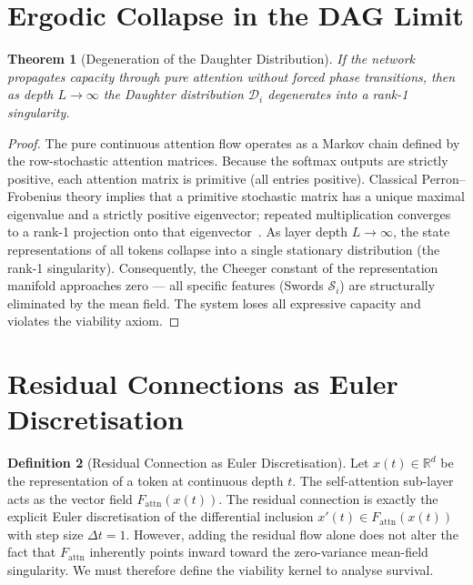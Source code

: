 \documentclass[11pt,a4paper]{article}
\newtheorem{theorem}{Theorem}[section]
\theoremstyle{definition}
\newtheorem{definition}[theorem]{Definition}
\theoremstyle{remark}
\begin{document}
\section{Ergodic Collapse in the DAG Limit}

\begin{theorem}[Degeneration of the Daughter Distribution]\label{thm:ergodic}
If the network propagates capacity through pure attention without forced phase transitions, then as depth $L \to \infty$ the Daughter distribution $\mathcal{D}_i$ degenerates into a rank-1 singularity.
\end{theorem}

\begin{proof}
The pure continuous attention flow operates as a Markov chain defined by the row-stochastic attention matrices. Because the softmax outputs are strictly positive, each attention matrix is primitive (all entries positive). Classical Perron--Frobenius theory implies that a primitive stochastic matrix has a unique maximal eigenvalue and a strictly positive eigenvector; repeated multiplication converges to a rank-1 projection onto that eigenvector~\cite{knill2011}. As layer depth $L \to \infty$, the state representations of all tokens collapse into a single stationary distribution (the rank-1 singularity). Consequently, the Cheeger constant of the representation manifold approaches zero --- all specific features (Swords $\mathcal{S}_i$) are structurally eliminated by the mean field. The system loses all expressive capacity and violates the viability axiom.
\end{proof}


\section{Residual Connections as Euler Discretisation}

\begin{definition}[Residual Connection as Euler Discretisation]\label{def:residual}
Let $x(t) \in \mathbb{R}^d$ be the representation of a token at continuous depth $t$. The self-attention sub-layer acts as the vector field $F_{\mathrm{attn}}(x(t))$. The residual connection is exactly the explicit Euler discretisation of the differential inclusion $x'(t) \in F_{\mathrm{attn}}(x(t))$ with step size $\Delta t = 1$. However, adding the residual flow alone does not alter the fact that $F_{\mathrm{attn}}$ inherently points inward toward the zero-variance mean-field singularity. We must therefore define the viability kernel to analyse survival.
\end{definition}
\end{document}
